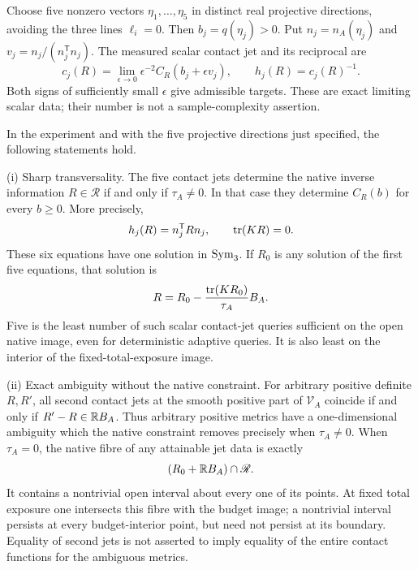 Choose five nonzero vectors $\eta_1,\ldots,\eta_5$ in distinct real projective directions, avoiding the three lines $\ell_i=0$. Then $b_j=q(\eta_j)>0$. Put $n_j=n_A(\eta_j)$ and $v_j=n_j/(n_j^{\mathsf T}n_j)$. The measured scalar contact jet and its reciprocal are
\begin{equation}\label{eq:jet-data}
 c_j(R)=\lim_{\epsilon\to0}\epsilon^{-2}C_R(b_j+\epsilon v_j),
 \qquad h_j(R)=c_j(R)^{-1}.
\end{equation}
Both signs of sufficiently small $\epsilon$ give admissible targets. These are exact limiting scalar data; their number is not a sample-complexity assertion.

\begin{corollary}\label{thm:tomography}
In the experiment and with the five projective directions just specified, the following statements hold.

\smallskip\noindent\textup{(i) Sharp transversality.}
The five contact jets determine the native inverse information $R\in\mathscr R$ if and only if $\tau_A\ne0$. In that case they determine $C_R(b)$ for every $b\ge0$. More precisely,
\begin{equation}\label{eq:linear-jet-recovery}
 h_j(R)=n_j^{\mathsf T}Rn_j,\qquad \operatorname{tr}(KR)=0.
\end{equation}
These six equations have one solution in $\operatorname{Sym}_3$. If $R_0$ is any solution of the first five equations, that solution is
\begin{equation}\label{eq:explicit-recovery}
 R=R_0-\frac{\operatorname{tr}(KR_0)}{\tau_A}B_A.
\end{equation}
Five is the least number of such scalar contact-jet queries sufficient on the open native image, even for deterministic adaptive queries. It is also least on the interior of the fixed-total-exposure image.

\smallskip\noindent\textup{(ii) Exact ambiguity without the native constraint.}
For arbitrary positive definite $R,R'$, all second contact jets at the smooth positive part of $\mathcal V_A$ coincide if and only if $R'-R\in\mathbb R B_A$. Thus arbitrary positive metrics have a one-dimensional ambiguity which the native constraint removes precisely when $\tau_A\ne0$. When $\tau_A=0$, the native fibre of any attainable jet data is exactly
\begin{equation}\label{eq:exception-fibre}
 (R_0+\mathbb R B_A)\cap\mathscr R.
\end{equation}
It contains a nontrivial open interval about every one of its points. At fixed total exposure one intersects this fibre with the budget image; a nontrivial interval persists at every budget-interior point, but need not persist at its boundary. Equality of second jets is not asserted to imply equality of the entire contact functions for the ambiguous metrics.


\end{corollary}
